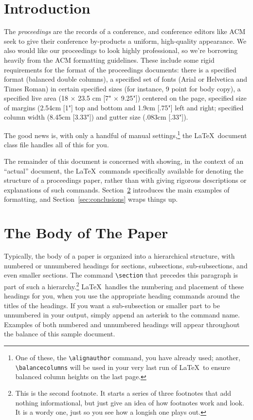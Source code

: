 \documentclass{sig-alternate}
\begin{document}

\section{Introduction}
\label{sec:introduction}

The \textit{proceedings} are the records of a conference, and conference
editors like ACM seek to give their conference by-products a uniform,
high-quality appearance. We also would like our proceedings to look highly
professional, so we're borrowing heavily from the ACM formatting guidelines.
These include some
rigid requirements for the format of the proceedings documents: there
is a specified format (balanced  double columns), a specified
set of fonts (Arial or Helvetica and Times Roman) in
certain specified sizes (for instance, 9 point for body copy),
a specified live area (18 $\times$ 23.5 cm [7" $\times$ 9.25"]) centered on
the page, specified size of margins (2.54cm [1"] top and
bottom and 1.9cm [.75"] left and right; specified column width
(8.45cm [3.33"]) and gutter size (.083cm [.33"]).


The good news is, with only a handful of manual
settings,\footnote{One of these, the \texttt{\textbackslash alignauthor} command, 
you have
already used; another, \texttt{\textbackslash balancecolumns} will
be used in your very last run of \LaTeX\ to ensure
balanced column heights on the last page.} the \LaTeX\ document
class file handles all of this for you.

The remainder of this document is concerned with showing, in
the context of an ``actual'' document, the \LaTeX\ commands
specifically available for denoting the structure of a
proceedings paper, rather than with giving rigorous descriptions
or explanations of such commands. Section~\ref{sec:body} introduces the main
examples of formatting, and Section~\ref{sec:conclusions} wraps things up. 

\section{The {\secit Body} of The Paper}
\label{sec:body}

Typically, the body of a paper is organized
into a hierarchical structure, with numbered or unnumbered
headings for sections, subsections, sub-subsections, and even
smaller sections.  The command \texttt{\textbackslash section} that
precedes this paragraph is part of such a
hierarchy.\footnote{This is the second footnote.  It
starts a series of three footnotes that add nothing
informational, but just give an idea of how footnotes work
and look. It is a wordy one, just so you see
how a longish one plays out.} \LaTeX\ handles the numbering
and placement of these headings for you, when you use
the appropriate heading commands around the titles
of the headings.  If you want a sub-subsection or
smaller part to be unnumbered in your output, simply append an
asterisk to the command name.  Examples of both
numbered and unnumbered headings will appear throughout the
balance of this sample document.
\end{document}
